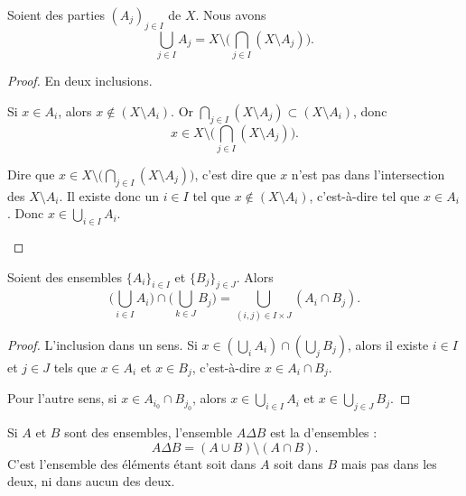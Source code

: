 \begin{lemma}	\label{LEMooMDTPooAhmYqv}
	Soient des parties \( (A_j)_{j\in I}\) de \( X\). Nous avons
	\begin{equation}
		\bigcup_{j\in I}A_j=X\setminus\Big( \bigcap_{j\in I}(X\setminus A_j) \Big).
	\end{equation}
\end{lemma}

\begin{proof}
	En deux inclusions.
	\begin{subproof}
		Si \( x\in A_i\), alors \( x\not\in (X\setminus A_i)\). Or \( \bigcap_{j\in I}(X\setminus A_j)\subset (X\setminus A_i)\), donc
		\begin{equation}
			x\in  X\setminus\Big( \bigcap_{j\in I}(X\setminus A_j) \Big).
		\end{equation}

		Dire que \( x\in  X\setminus\Big( \bigcap_{j\in I}(X\setminus A_j) \Big)\), c'est dire que \( x\) n'est pas dans l'intersection des \( X\setminus A_i\). Il existe donc un \( i\in I\) tel que \( x\notin (X\setminus A_i)\), c'est-à-dire tel que \( x\in A_i\). Donc \( x\in\bigcup_{i\in I}A_i\).
	\end{subproof}
\end{proof}

\begin{lemma}	\label{LEMooPWUHooMBKquL}
	Soient des ensembles \( \{ A_i \}_{i\in I}\) et \( \{ B_j \}_{j\in J}\). Alors
	\begin{equation}
		\Big( \bigcup_{i\in I}A_i \Big)\cap \Big( \bigcup_{k\in J}B_j \Big)=\bigcup_{(i,j)\in I\times J}(A_i\cap B_j).
	\end{equation}
\end{lemma}

\begin{proof}
	L'inclusion dans un sens. Si \( x\in (\bigcup_iA_i)\cap (\bigcup_{j}B_j)\), alors il existe \( i\in I\) et \( j\in J\) tels que \( x\in A_i\) et \( x\in B_j\), c'est-à-dire \( x\in A_i\cap B_j\).

	Pour l'autre sens, si \( x\in A_{i_0}\cap B_{j_0}\), alors \( x\in \bigcup_{i\in I}A_i \) et \( x\in \bigcup_{j\in J}B_j\).
\end{proof}

\begin{definition}    \label{DefBMLooVjlSG}
	Si \( A\) et \( B\) sont des ensembles, l'ensemble \( A\Delta B\) est la  d'ensembles :
	\begin{equation}
		A\Delta B=(A\cup B)\setminus(A\cap B).
	\end{equation}
	C'est l'ensemble des éléments étant soit dans \( A\) soit dans \( B\) mais pas dans les deux, ni dans aucun des deux.
\end{definition}

